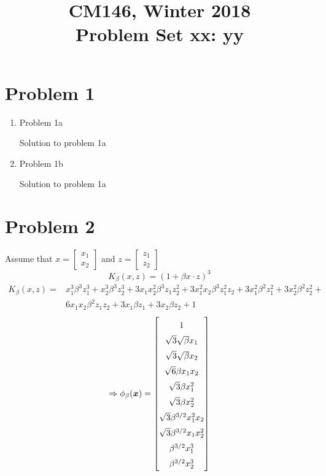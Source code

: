 \documentclass[11pt]{article}
\newcommand{\cnum}{CM146}
\newcommand{\ced}{Winter 2018}
\newcommand{\ctitle}[3]{\title{\vspace{-0.5in}\cnum, \ced\\Problem Set #1: #2}}
\newcommand{\solution}[1]{{{\color{blue}{\bf Solution:} {#1}}}}
\begin{document}
\ctitle{xx}{yy}
\author{}
\date{}
\maketitle
\vspace{-0.75in}

\section{Problem 1}
\begin{enumerate}
\item Problem 1a

\solution{Solution to problem 1a}

\vspace{10cm}
\item Problem 1b

\solution{Solution to problem 1a}
\end{enumerate}

\newpage
\section{Problem 2}

\solution{} \newline
Assume that $x = \begin{bmatrix}
x_1 \\
x_2
\end{bmatrix}
$ and $ z = \begin{bmatrix}
z_1 \\
z_2
\end{bmatrix}
$
$$
K_\beta (x, z) = (1 + \beta x \cdot z)^3
$$
\begin{align*}
K_\beta (x, z) = & x_1^3 \beta^3 z_1^3 + x_2^3 \beta^3 z_2^3 + 3 x_1 x_2^2 \beta^3 z_1 z_2^2 + 3 x_1^2 x_2 \beta^3 z_1^2 z_2 + 3 x_1^2 \beta^2 z_1^2 + 3 x_2^2 \beta^2 z_2^2 + \\ 
&  6 x_1 x_2 \beta^2 z_1 z_2 + 3 x_1 \beta z_1 + 3 x_2 \beta z_2 + 1
\end{align*}
$$
\Rightarrow \phi_{\beta}(\boldsymbol{x}) = 
\begingroup
\renewcommand*{\arraystretch}{1.5}
\begin{bmatrix}
1 \\
\sqrt{3}\sqrt{\beta}x_1 \\ 
\sqrt{3}\sqrt{\beta}x_2 \\
\sqrt{6} \beta x_1 x_2 \\
\sqrt{3} \beta x_1^2 \\
\sqrt{3} \beta x_2^2 \\
\sqrt{3}\beta^{3/2} x_1^2 x_2 \\
\sqrt{3}\beta^{3/2} x_1 x_2^2 \\
\beta^{3/2}x_1^3 \\
\beta^{3/2}x_2^3 \\
\end{bmatrix}
\endgroup
$$
\end{document}
